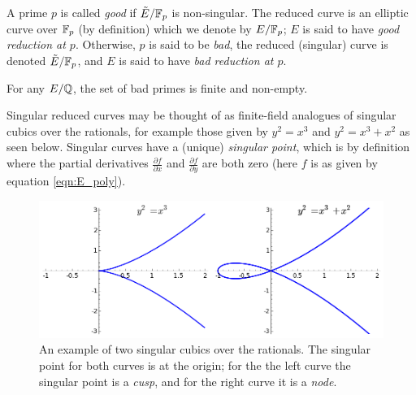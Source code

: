 \documentclass[10pt]{article}
\begin{document}
\begin{definition}
A prime $p$ is called {\it good} if $\tilde{E}/\mathbb{F}_p$ is non-singular. The reduced curve is an elliptic curve over $\mathbb{F}_p$ (by definition) which we denote by $E/\mathbb{F}_p$; $E$ is said to have {\it good reduction at $p$}. Otherwise, $p$ is said to be {\it bad}, the reduced (singular) curve is denoted $\tilde{E}/\mathbb{F}_p$, and $E$ is said to have {\it bad reduction at $p$}.
\end{definition}

\begin{theorem}
For any $E/\mathbb{Q}$, the set of bad primes is finite and non-empty.
\end{theorem}

Singular reduced curves may be thought of as finite-field analogues of singular cubics over the rationals, for example those given by $y^2 = x^3$ and $y^2 = x^3+x^2$ as seen below. Singular curves have a (unique) {\it singular point}, which is by definition where the partial derivatives $\frac{\partial f}{\partial x}$ and $\frac{\partial f}{\partial y}$ are both zero (here $f$ is as given by equation \ref{eqn:E_poly}).

\begin{figure}[!h]
    \centering
    \includegraphics[width=1.0\textwidth]{graphics/singular_cubics.png}
    \caption{An example of two singular cubics over the rationals. The singular point for both curves is at the origin; for the the left curve the singular point is a {\it cusp}, and for the right curve it is a {\it node}.}
    \label{fig:singular_cubics}
\end{figure}
\end{document}
